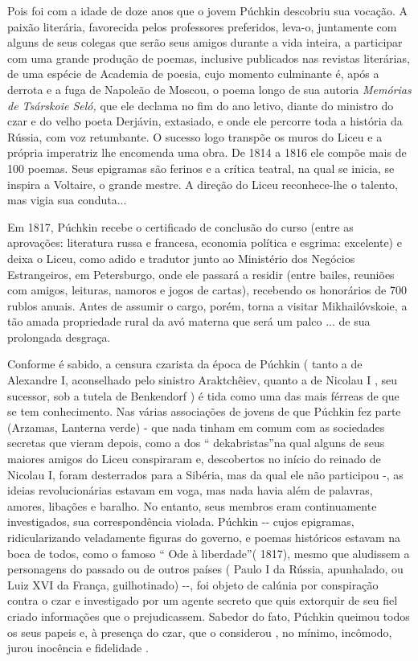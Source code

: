 Pois foi com a idade de doze anos que o jovem Púchkin descobriu sua
vocação. A paixão literária, favorecida pelos professores preferidos,
leva-o, juntamente com alguns de seus colegas que serão seus amigos
durante a vida inteira, a participar com uma grande produção de poemas,
inclusive publicados nas revistas literárias, de uma espécie de Academia
de poesia, cujo momento culminante é, após a derrota e a fuga de
Napoleão de Moscou, o poema longo de sua autoria \emph{Memórias de
Tsárskoie Seló,} que ele declama no fim do ano letivo, diante do
ministro do czar e do velho poeta Derjávin, extasiado, e onde ele
percorre toda a história da Rússia, com voz retumbante. O sucesso logo
transpõe os muros do Liceu e a própria imperatriz lhe encomenda uma
obra. De 1814 a 1816 ele compõe mais de 100 poemas. Seus epigramas são
ferinos e a crítica teatral, na qual se inicia, se inspira a Voltaire, o
grande mestre. A direção do Liceu reconhece-lhe o talento, mas vigia sua
conduta...

Em 1817, Púchkin recebe o certificado de conclusão do curso (entre as
aprovações: literatura russa e francesa, economia política e esgrima:
excelente) e deixa o Liceu, como adido e tradutor junto ao Ministério
dos Negócios Estrangeiros, em Petersburgo, onde ele passará a residir
(entre bailes, reuniões com amigos, leituras, namoros e jogos de
cartas), recebendo os honorários de 700 rublos anuais. Antes de assumir
o cargo, porém, torna a visitar Mikhailóvskoie, a tão amada propriedade
rural da avó materna que será um palco ... de sua prolongada desgraça.

Conforme é sabido, a censura czarista da época de Púchkin ( tanto a de
Alexandre I, aconselhado pelo sinistro Araktchêiev, quanto a de Nicolau
I , seu sucessor, sob a tutela de Benkendorf ) é tida como uma das mais
férreas de que se tem conhecimento. Nas várias associações de jovens de
que Púchkin fez parte (Arzamas, Lanterna verde) - que nada tinham em
comum com as sociedades secretas que vieram depois, como a dos ``
dekabristas''na qual alguns de seus maiores amigos do Liceu conspiraram
e, descobertos no início do reinado de Nicolau I, foram desterrados para
a Sibéria, mas da qual ele não participou -, as ideias revolucionárias
estavam em voga, mas nada havia além de palavras, amores, libações e
baralho. No entanto, seus membros eram continuamente investigados, sua
correspondência violada. Púchkin -\/- cujos epigramas, ridicularizando
veladamente figuras do governo, e poemas históricos estavam na boca de
todos, como o famoso `` Ode à liberdade''( 1817), mesmo que aludissem a
personagens do passado ou de outros países ( Paulo I da Rússia,
apunhalado, ou Luiz XVI da França, guilhotinado) -\/-, foi objeto de
calúnia por conspiração contra o czar e investigado por um agente
secreto que quis extorquir de seu fiel criado informações que o
prejudicassem. Sabedor do fato, Púchkin queimou todos os seus papeis e,
à presença do czar, que o considerou , no mínimo, incômodo, jurou
inocência e fidelidade .

